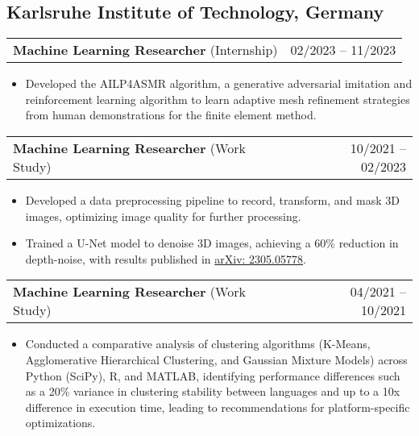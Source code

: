 \documentclass[letterpaper,11pt]{article}
\makeatletter
\newcommand{\resumeItem}[1]{
  \item\small{
    {#1 \vspace{-2pt}}
  }
}
\newcommand{\resumeProjectHeading}[2]{
    \item
    \begin{tabular*}{0.97\textwidth}{l@{\extracolsep{\fill}}r}
      \small#1 & #2 \\
    \end{tabular*}\vspace{-7pt}
}
\newcommand{\resumeItemListStart}{\begin{itemize}[leftmargin=0.2in]}
\newcommand{\resumeItemListEnd}{\end{itemize}\vspace{-5pt}}
\makeatother
\begin{document}
\subsection{\textbf{Karlsruhe Institute of Technology}, Germany}{\vspace{-5px}}
\resumeProjectHeading
{\textbf{Machine Learning Researcher} (Internship)}{02/2023 -- 11/2023}
\resumeItemListStart
\resumeItem{Developed the AILP4ASMR algorithm, a generative adversarial imitation and reinforcement learning algorithm to learn adaptive mesh refinement strategies from human demonstrations for the finite element method.}
\resumeItemListEnd

\resumeProjectHeading
{\textbf{Machine Learning Researcher} (Work Study)}{10/2021 -- 02/2023}
\resumeItemListStart
\resumeItem{Developed a data preprocessing pipeline to record, transform, and mask 3D images, optimizing image quality for further processing.}
\resumeItem{Trained a U-Net model to denoise 3D images, achieving a 60\% reduction in depth-noise, with results published in \href{https://arxiv.org/abs/2305.05778}{{arXiv: 2305.05778}}.}
\resumeItemListEnd

\resumeProjectHeading
{\textbf{Machine Learning Researcher} (Work Study)}{04/2021 -- 10/2021}
\resumeItemListStart
\resumeItem{Conducted a comparative analysis of clustering algorithms (K-Means, Agglomerative Hierarchical Clustering, and Gaussian Mixture Models) across Python (SciPy), R, and MATLAB, identifying performance differences such as a 20\% variance in clustering stability between languages and up to a 10x difference in execution time, leading to recommendations for platform-specific optimizations.}
\resumeItemListEnd
\end{document}
